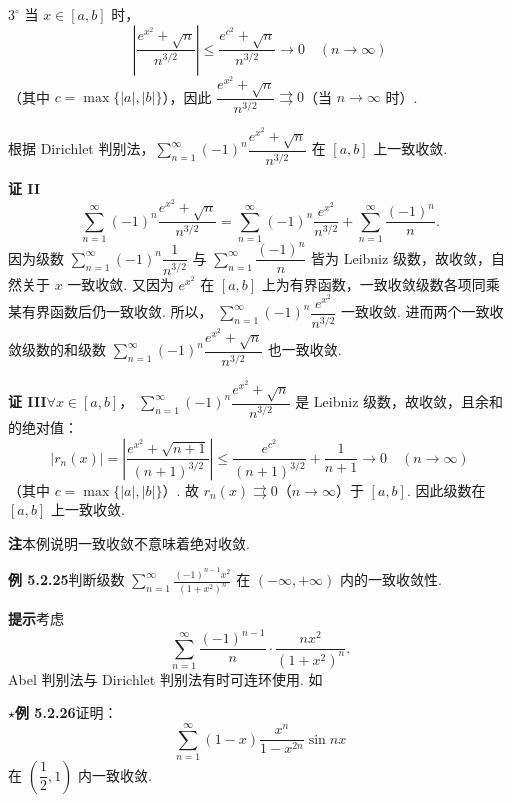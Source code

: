 \documentclass[UTF8,12pt,a4paper,fontset=fandol]{ctexart}
\begin{document}
$3^\circ$ 当 $x\in[a,b]$ 时，
\[
  \left|\frac{e^{x^2}+\sqrt n}{n^{3/2}}\right|
  \le\frac{e^{c^2}+\sqrt n}{n^{3/2}}\to0\quad(n\to\infty)
\]
（其中 $c=\max\{|a|,|b|\}$），因此
$\dfrac{e^{x^2}+\sqrt n}{n^{3/2}}\rightrightarrows0$（当 $n\to\infty$ 时）.

根据 Dirichlet 判别法，$\displaystyle\sum_{n=1}^{\infty}(-1)^n\dfrac{e^{x^2}+\sqrt n}{n^{3/2}}$
在 $[a,b]$ 上一致收敛.

\noindent\textbf{证 II}\quad
\[
  \sum_{n=1}^{\infty}(-1)^n\frac{e^{x^2}+\sqrt n}{n^{3/2}}
  =\sum_{n=1}^{\infty}(-1)^n\frac{e^{x^2}}{n^{3/2}}
  +\sum_{n=1}^{\infty}\frac{(-1)^n}{n}.
\]
因为级数 $\displaystyle\sum_{n=1}^{\infty}(-1)^n\dfrac1{n^{3/2}}$ 与
$\displaystyle\sum_{n=1}^{\infty}\dfrac{(-1)^n}{n}$ 皆为 Leibniz 级数，故收敛，自然关于
$x$ 一致收敛. 又因为 $e^{x^2}$ 在 $[a,b]$ 上为有界函数，一致收敛级数各项同乘某有界函数后仍一致收敛. 所以，
$\displaystyle\sum_{n=1}^{\infty}(-1)^n\dfrac{e^{x^2}}{n^{3/2}}$ 一致收敛. 进而两个一致收敛级数的和级数
$\displaystyle\sum_{n=1}^{\infty}(-1)^n\dfrac{e^{x^2}+\sqrt n}{n^{3/2}}$ 也一致收敛.

\noindent\textbf{证 III}\quad $\forall x\in[a,b]$，
$\displaystyle\sum_{n=1}^{\infty}(-1)^n\dfrac{e^{x^2}+\sqrt n}{n^{3/2}}$ 是 Leibniz 级数，故收敛，且余和的绝对值：
\[
  |r_n(x)|=\left|\frac{e^{x^2}+\sqrt{n+1}}{(n+1)^{3/2}}\right|
  \le\frac{e^{c^2}}{(n+1)^{3/2}}+\frac1{n+1}\to0\quad(n\to\infty)
\]
（其中 $c=\max\{|a|,|b|\}$）. 故 $r_n(x)\rightrightarrows0$（$n\to\infty$）于
$[a,b]$. 因此级数在 $[a,b]$ 上一致收敛.

\noindent\textbf{注}\quad 本例说明一致收敛不意味着绝对收敛.

\noindent\textbf{例 5.2.25}\quad 判断级数
$\displaystyle\sum_{n=1}^{\infty}\frac{(-1)^{n-1}x^2}{(1+x^2)^n}$ 在 $(-\infty,+\infty)$ 内的一致收敛性.

\noindent\textbf{提示}\quad 考虑
\[
  \sum_{n=1}^{\infty}\frac{(-1)^{n-1}}{n}\cdot\frac{nx^2}{(1+x^2)^n}.
\]
Abel 判别法与 Dirichlet 判别法有时可连环使用. 如

\noindent\textbf{$\star$例 5.2.26}\quad 证明：
\[
  \sum_{n=1}^{\infty}(1-x)\frac{x^n}{1-x^{2n}}\sin nx
\]
在 $\left(\dfrac12,1\right)$ 内一致收敛.
\end{document}
